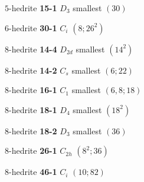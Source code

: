 \documentclass[12pt]{article}
\begin{document}
\begin{remark!!}
\begin{figure}
{\small
\begin{minipage}[t]{4cm}
\centering
\epsfxsize=4cm
\par
{$5$-hedrite {\bf 15-1} $D_3$ smallest $(30)$}
\end{minipage}
\begin{minipage}[t]{4cm}
\centering
\epsfxsize=4cm
\par
{$6$-hedrite {\bf 30-1} $C_i$ $(8;26^2)$}
\end{minipage}
\begin{minipage}[t]{4cm}
\centering
\epsfxsize=4cm
\par
{$8$-hedrite {\bf 14-4} $D_{2d}$ smallest $(14^2)$}
\end{minipage}
\begin{minipage}[t]{4cm}
\centering
\epsfxsize=4cm
\par
{$8$-hedrite {\bf 14-2} $C_s$ smallest $(6;22)$}
\end{minipage}
\begin{minipage}[t]{4cm}
\centering
\epsfxsize=4cm
\par
{$8$-hedrite {\bf 16-1} $C_1$ smallest $(6, 8; 18)$}
\end{minipage}
\begin{minipage}[t]{4cm}
\centering
\epsfxsize=4cm
\par
{$8$-hedrite {\bf 18-1} $D_4$ smallest $(18^2)$}
\end{minipage}
\begin{minipage}[t]{4cm}
\centering
\epsfxsize=4cm
\par
{$8$-hedrite {\bf 18-2} $D_3$ smallest $(36)$}
\end{minipage}
\begin{minipage}[t]{4cm}
\centering
\epsfxsize=4cm
\par
{$8$-hedrite {\bf 26-1} $C_{2h}$ $(8^2; 36)$}
\end{minipage}
\setlength{\unitlength}{1cm}
\begin{minipage}[t]{4cm}
\centering
\epsfxsize=4cm
\par
{$8$-hedrite {\bf 46-1} $C_i$ $(10; 82)$}
\end{minipage}
}
\end{figure}
\end{remark!!}
\end{document}
